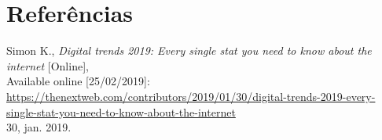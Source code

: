 \section{Referências}
\begingroup
\renewcommand{\section}[2]{}
\begin{thebibliography}{9}

    \vspace{-0.2cm}

    Simon K.,
    \textit{Digital trends 2019: Every single stat you need to know about the internet} [Online], \\
    Available online [25/02/2019]: \url{https://thenextweb.com/contributors/2019/01/30/digital-trends-2019-every-single-stat-you-need-to-know-about-the-internet} \\
    30, jan. 2019.\\


\end{thebibliography}
